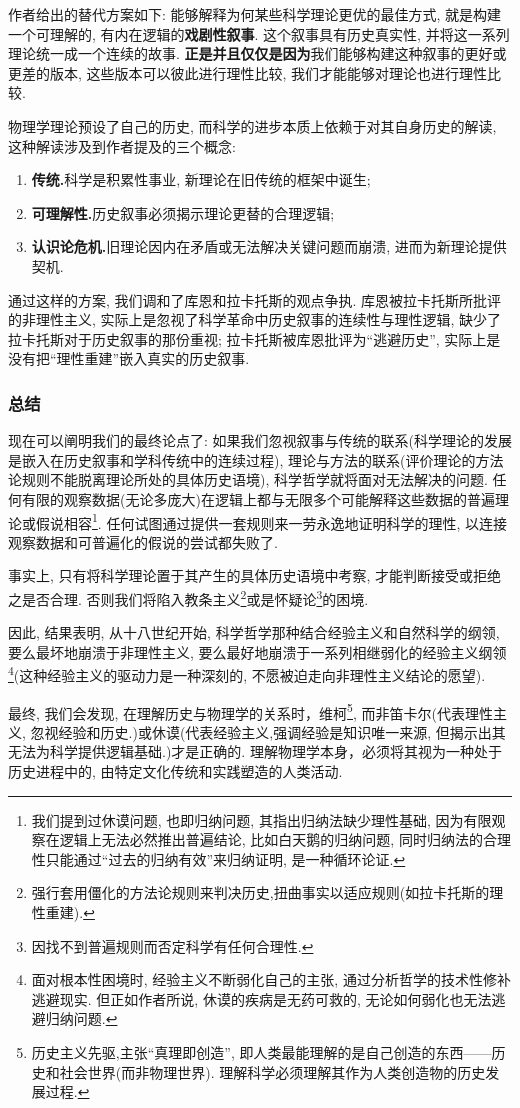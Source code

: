 \documentclass[12pt, a4paper, oneside]{ctexart}
\renewcommand{\b}{\textbf}
\newcommand{\f}{\footnote}
\begin{document}
作者给出的替代方案如下: 能够解释为何某些科学理论更优的最佳方式, 就是构建一个可理解的, 有内在逻辑的\b{戏剧性叙事}. 这个叙事具有历史真实性, 并将这一系列理论统一成一个连续的故事. \b{正是并且仅仅是因为}我们能够构建这种叙事的更好或更差的版本, 这些版本可以彼此进行理性比较, 我们才能能够对理论也进行理性比较. 

物理学理论预设了自己的历史, 而科学的进步本质上依赖于对其自身历史的解读, 这种解读涉及到作者提及的三个概念: 
\begin{enumerate}
    \item \b{传统.}科学是积累性事业, 新理论在旧传统的框架中诞生;
    \item \b{可理解性.}历史叙事必须揭示理论更替的合理逻辑;
    \item \b{认识论危机.}旧理论因内在矛盾或无法解决关键问题而崩溃, 进而为新理论提供契机.
\end{enumerate}

通过这样的方案, 我们调和了库恩和拉卡托斯的观点争执. 库恩被拉卡托斯所批评的非理性主义, 实际上是忽视了科学革命中历史叙事的连续性与理性逻辑, 缺少了拉卡托斯对于历史叙事的那份重视; 拉卡托斯被库恩批评为``逃避历史'', 实际上是没有把``理性重建''嵌入真实的历史叙事. 

\subsubsection{总结}

现在可以阐明我们的最终论点了: 如果我们忽视叙事与传统的联系(科学理论的发展是嵌入在历史叙事和学科传统中的连续过程), 理论与方法的联系(评价理论的方法论规则不能脱离理论所处的具体历史语境), 科学哲学就将面对无法解决的问题. 任何有限的观察数据(无论多庞大)在逻辑上都与无限多个可能解释这些数据的普遍理论或假说相容\f{我们提到过休谟问题, 也即归纳问题, 其指出归纳法缺少理性基础, 因为有限观察在逻辑上无法必然推出普遍结论, 比如白天鹅的归纳问题, 同时归纳法的合理性只能通过``过去的归纳有效''来归纳证明, 是一种循环论证.}. 任何试图通过提供一套规则来一劳永逸地证明科学的理性, 以连接观察数据和可普遍化的假说的尝试都失败了. 

事实上, 只有将科学理论置于其产生的具体历史语境中考察, 才能判断接受或拒绝之是否合理. 否则我们将陷入教条主义\f{强行套用僵化的方法论规则来判决历史,扭曲事实以适应规则(如拉卡托斯的理性重建).}或是怀疑论\f{因找不到普遍规则而否定科学有任何合理性.}的困境. 

因此, 结果表明, 从十八世纪开始, 科学哲学那种结合经验主义和自然科学的纲领, 要么最坏地崩溃于非理性主义, 要么最好地崩溃于一系列相继弱化的经验主义纲领\f{面对根本性困境时, 经验主义不断弱化自己的主张, 通过分析哲学的技术性修补逃避现实. 但正如作者所说, 休谟的疾病是无药可救的, 无论如何弱化也无法逃避归纳问题. }(这种经验主义的驱动力是一种深刻的, 不愿被迫走向非理性主义结论的愿望). 

最终, 我们会发现, 在理解历史与物理学的关系时，维柯\f{历史主义先驱,主张``真理即创造'', 即人类最能理解的是自己创造的东西——历史和社会世界(而非物理世界). 理解科学必须理解其作为人类创造物的历史发展过程. }, 而非笛卡尔(代表理性主义, 忽视经验和历史.)或休谟(代表经验主义,强调经验是知识唯一来源, 但揭示出其无法为科学提供逻辑基础.)才是正确的. 理解物理学本身，必须将其视为一种处于历史进程中的, 由特定文化传统和实践塑造的人类活动.
\end{document}
